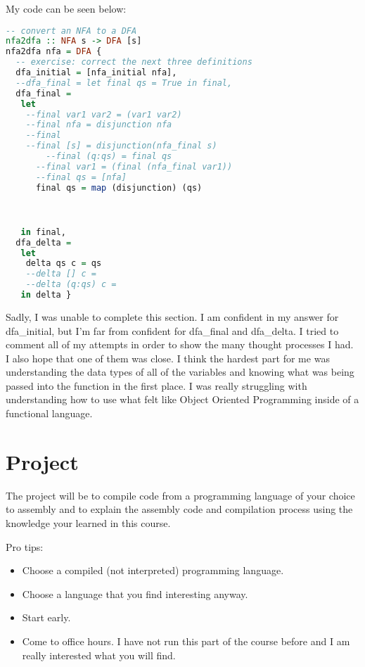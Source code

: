 \documentclass{article}
\theoremstyle{theorem}
\theoremstyle{definition}
\theoremstyle{remark}
\begin{document}
My code can be seen below:

\begin{lstlisting}[language=Haskell]
-- convert an NFA to a DFA
nfa2dfa :: NFA s -> DFA [s]
nfa2dfa nfa = DFA {
  -- exercise: correct the next three definitions 
  dfa_initial = [nfa_initial nfa],
  --dfa_final = let final qs = True in final,
  dfa_final = 
   let 
    --final var1 var2 = (var1 var2)
    --final nfa = disjunction nfa
    --final 
    --final [s] = disjunction(nfa_final s)
        --final (q:qs) = final qs
      --final var1 = (final (nfa_final var1))
      --final qs = [nfa]
      final qs = map (disjunction) (qs)
      


   in final,
  dfa_delta = 
   let 
    delta qs c = qs 
    --delta [] c = 
    --delta (q:qs) c = 
   in delta }
\end{lstlisting}

Sadly, I was unable to complete this section. I am confident in my answer for dfa\_initial, but I'm far from confident for dfa\_final and dfa\_delta. 
I tried to comment all of my attempts in order to show the many thought processes I had. 
I also hope that one of them was close. I think the hardest part for me was understanding the data types of all of the variables and knowing what was being passed into the function in the first place. 
I was really struggling with understanding how to use what felt like Object Oriented Programming inside of a functional language. 

\section{Project}

The project will be to compile code from a programming language of your choice to assembly and to explain the assembly code and compilation process using the knowledge your learned in this course. 


\medskip\noindent
Pro tips:
\begin{itemize}
\item Choose a compiled (not interpreted) programming language.
\item Choose a language that you find interesting anyway.
\item Start early.
\item Come to office hours. I have not run this part of the course before and I am really interested what you will find.
\end{itemize}
 
\end{document}
